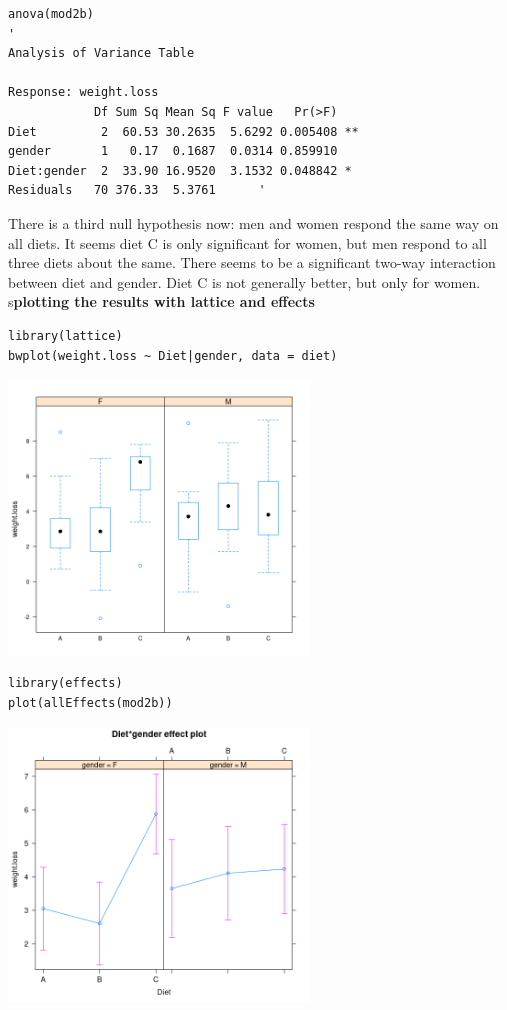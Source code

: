 \documentclass{article}
\begin{document}
\begin{lstlisting}
anova(mod2b)
'
Analysis of Variance Table

Response: weight.loss
            Df Sum Sq Mean Sq F value   Pr(>F)   
Diet         2  60.53 30.2635  5.6292 0.005408 **
gender       1   0.17  0.1687  0.0314 0.859910   
Diet:gender  2  33.90 16.9520  3.1532 0.048842 * 
Residuals   70 376.33  5.3761      '              

\end{lstlisting}
There is a third null hypothesis now: men and women respond the same way on all diets. It seems diet C is only significant for women, but men respond to all three diets about the same. There seems to be a significant two-way interaction between diet and gender. Diet C is not generally better, but only for women.\\
s\textbf{plotting the results with lattice and effects}
\begin{lstlisting}
library(lattice)
bwplot(weight.loss ~ Diet|gender, data = diet)
\end{lstlisting}
\begin{center}
\includegraphics[width = 0.6\textwidth]{lab3/lattice.png}
\end{center}

\begin{lstlisting}
library(effects)
plot(allEffects(mod2b))
\end{lstlisting}
\begin{center}
\includegraphics[width = 0.6\textwidth]{lab3/effects.png}
\end{center}
\end{document}
